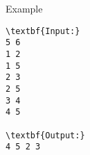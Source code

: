 Example
\begin{verbatim}
\textbf{Input:}
5 6
1 2
1 5
2 3
2 5
3 4
4 5

\textbf{Output:}
4 5 2 3
\end{verbatim}